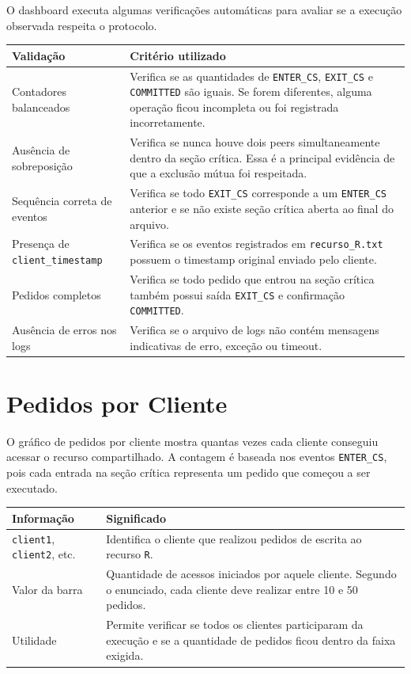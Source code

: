 \documentclass[12pt,a4paper]{article}
\begin{document}
O dashboard executa algumas verifica\c{c}\~oes autom\'aticas para avaliar se a execu\c{c}\~ao
observada respeita o protocolo.

\begin{longtable}{>{\raggedright\arraybackslash}p{5cm} >{\raggedright\arraybackslash}p{9cm}}
\toprule
\textbf{Valida\c{c}\~ao} & \textbf{Crit\'erio utilizado} \\
\midrule
Contadores balanceados &
Verifica se as quantidades de \texttt{ENTER\_CS}, \texttt{EXIT\_CS} e \texttt{COMMITTED}
s\~ao iguais. Se forem diferentes, alguma opera\c{c}\~ao ficou incompleta ou foi registrada
incorretamente. \\
Aus\^encia de sobreposi\c{c}\~ao &
Verifica se nunca houve dois peers simultaneamente dentro da se\c{c}\~ao cr\'itica. Essa
\'e a principal evid\^encia de que a exclus\~ao m\'utua foi respeitada. \\
Sequ\^encia correta de eventos &
Verifica se todo \texttt{EXIT\_CS} corresponde a um \texttt{ENTER\_CS} anterior e se n\~ao
existe se\c{c}\~ao cr\'itica aberta ao final do arquivo. \\
Presen\c{c}a de \texttt{client\_timestamp} &
Verifica se os eventos registrados em \texttt{recurso\_R.txt} possuem o timestamp original
enviado pelo cliente. \\
Pedidos completos &
Verifica se todo pedido que entrou na se\c{c}\~ao cr\'itica tamb\'em possui sa\'ida
\texttt{EXIT\_CS} e confirma\c{c}\~ao \texttt{COMMITTED}. \\
Aus\^encia de erros nos logs &
Verifica se o arquivo de logs n\~ao cont\'em mensagens indicativas de erro, exce\c{c}\~ao ou
timeout. \\
\bottomrule
\end{longtable}

\section{Pedidos por Cliente}

O gr\'afico de pedidos por cliente mostra quantas vezes cada cliente conseguiu acessar o
recurso compartilhado. A contagem \'e baseada nos eventos \texttt{ENTER\_CS}, pois cada
entrada na se\c{c}\~ao cr\'itica representa um pedido que come\c{c}ou a ser executado.

\begin{longtable}{>{\raggedright\arraybackslash}p{4cm} >{\raggedright\arraybackslash}p{10cm}}
\toprule
\textbf{Informa\c{c}\~ao} & \textbf{Significado} \\
\midrule
\texttt{client1}, \texttt{client2}, etc. &
Identifica o cliente que realizou pedidos de escrita ao recurso \texttt{R}. \\
Valor da barra &
Quantidade de acessos iniciados por aquele cliente. Segundo o enunciado, cada cliente deve
realizar entre 10 e 50 pedidos. \\
Utilidade &
Permite verificar se todos os clientes participaram da execu\c{c}\~ao e se a quantidade de
pedidos ficou dentro da faixa exigida. \\
\bottomrule
\end{longtable}
\end{document}

